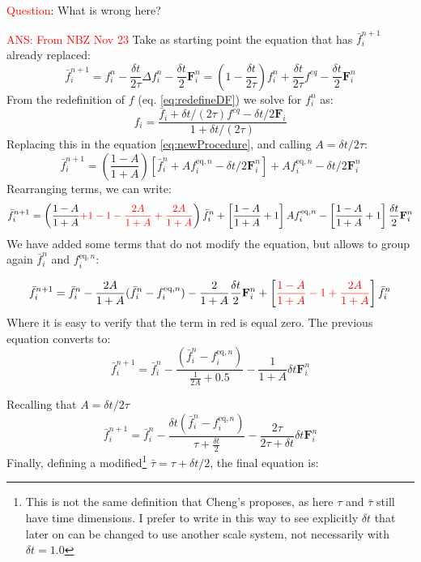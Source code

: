 \documentclass{article}
\begin{document}
	\textcolor{red}{Question}: What is wrong here?
	
	\textcolor{red}{ANS: From NBZ Nov 23}
	Take as starting point the equation that has $\bar{f}^{n+1}_i$ already replaced:
	\begin{equation*}\label{eq:newProcedure}
	\bar{f}^{n+1}_i = f^{n}_i - \frac{\delta t}{2\tau} \Delta f^n_i - \frac{\delta t}{2} \mathbf{F}^n_i = \left(1-\frac{\delta t}{2 \tau}\right) f^{n}_i + \frac{\delta t}{2\tau} f^{eq} - \frac{\delta t}{2} \mathbf{F}^n_i 
	\end{equation*}
	From the redefinition of $f$ (eq. \ref{eq:redefineDF}) we solve for $f^n_i$ as:
	\begin{equation*}
		f_i = \frac{\bar{f}_i + \delta t /(2\tau) f^{eq} - \delta t/2 \mathbf{F}_i}{1+\delta t /(2\tau)}
	\end{equation*}
	Replacing this in the equation \ref{eq:newProcedure}, and calling $A=\delta t / 2\tau$:
	\begin{equation*}
		\bar{f}^{n+1}_i  = \left(\frac{1-A}{1+A}\right) [\bar{f}^{n}_i + A f^{\text{eq},n}_i - \delta t /2 \mathbf{F}^n_i  ] + A f^{\text{eq},n}_i - \delta t /2 \mathbf{F}^n_i
	\end{equation*}
	Rearranging terms, we can write: 
	\begin{equation}
		\bar{f}^{n+1}_i  = \left(\frac{1-A}{1+A} {\color{red} +1-1 -\frac{2A}{1+A}+\frac{2A}{1+A}} \right)\bar{f}^{n}_i +\left[ \frac{1-A}{1+A} +1 \right] A f^{\text{eq},n}_i -\left[  \frac{1-A}{1+A} +1 \right] \frac{\delta t }{2} \mathbf{F}^n_i 
	\end{equation}
	We have added some terms that do not modify the equation, but allows to group again $\bar{f}^{n}_i$ and $f^{\text{eq},n}_i$:
	
	\begin{equation}
	\bar{f}^{n+1}_i  = \bar{f}^{n}_i  - \frac{2A}{1+A} (\bar{f}^{n}_i - f^{\text{eq},n}_i) -\frac{2}{1+A} \frac{\delta t}{2} \mathbf{F}^n_i + \left[{\color{red} \frac{1-A}{1+A} -1 +\frac{2A}{1+A}} \right]\bar{f}^{n}_i
	\end{equation}
	Where it is easy to verify that the term in {\color{red} red} is equal zero. The previous equation converts to:
	\begin{equation}
	\bar{f}^{n+1}_i  = \bar{f}^{n}_i  - \frac{(\bar{f}^{n}_i - f^{\text{eq},n}_i)}{\frac{1}{2A}+0.5}  -\frac{1}{1+A}\delta t \mathbf{F}^n_i 
	\end{equation}
	
	Recalling that $A=\delta t / 2\tau$
	\begin{equation}
	\bar{f}^{n+1}_i  = \bar{f}^{n}_i  - \frac{\delta t(\bar{f}^{n}_i - f^{\text{eq},n}_i)}{\tau + \frac{\delta t}{2}} - \frac{2\tau}{2\tau+\delta t}\delta t \mathbf{F}^n_i 
	\end{equation}
	Finally, defining a modified\footnote{This is not the same definition that Cheng's proposes, as here $\tau$ and $\bar{\tau}$ still have time dimensions. I prefer to write in this way to see explicitly $\delta t$ that later on can be changed to use another scale system, not necessarily with $\delta t=1.0$} $\bar{\tau}= \tau + \delta t/2$, the final equation is:
	
\end{document}
